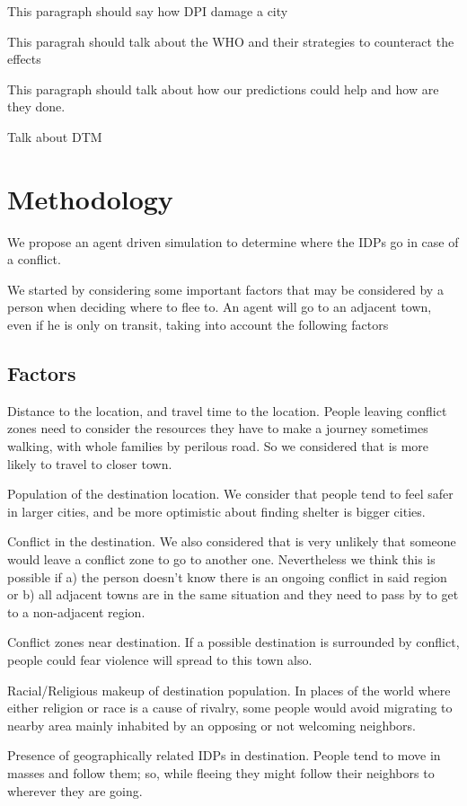 \documentclass[11pt]{article}
\begin{document}
This paragraph should say how DPI damage a city

This paragrah should talk about the WHO and their strategies to counteract the effects


This paragraph should talk about how our predictions could help and how are they done.

Talk about DTM

\section{Methodology}
\label{sec-2}
We propose an agent driven simulation to determine where the IDPs go in case of a conflict.

We started by considering some important factors that may be considered by a
person when deciding where to flee to. An agent will go to an adjacent town,
even if he is only on transit, taking into account the following factors
\subsection{Factors}
\label{sec-2-1}
Distance to the location, and travel time to the location.
People leaving conflict zones need to consider the resources they have to make a journey sometimes walking, with whole families by perilous road. So we considered that is more likely to travel to closer town.

Population of the destination location.  We consider that people tend to feel
safer in larger cities, and be more optimistic about finding shelter is bigger
cities.

Conflict in the destination.  We also considered that is very unlikely that
someone would leave a conflict zone to go to another one. Nevertheless we think
this is possible if a) the person doesn’t know there is an ongoing conflict in
said region or b) all adjacent towns are in the same situation and they need to
pass by to get to a non-adjacent region.

Conflict zones near destination.  If a possible destination is surrounded by
conflict, people could fear violence will spread to this town also.

Racial/Religious makeup of destination population.  In places of the world where
either religion or race is a cause of rivalry, some people would avoid migrating
to nearby area mainly inhabited by an opposing or not welcoming neighbors.

Presence of geographically related IDPs in destination.  People tend to move in
masses and follow them; so, while fleeing they might follow their neighbors to
wherever they are going.
\end{document}
